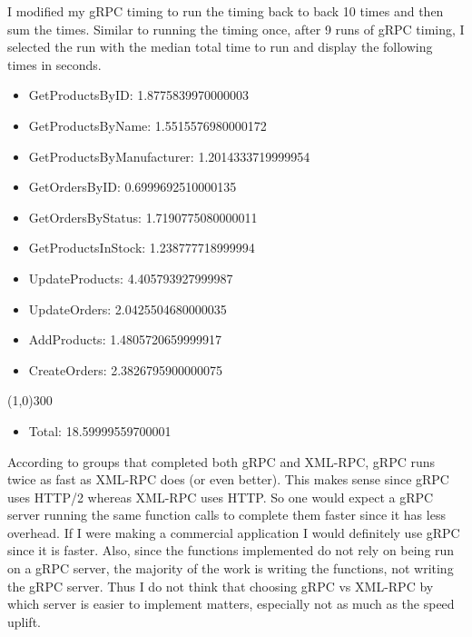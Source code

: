 \documentclass[12pt]{article}
\begin{document}
I modified my gRPC timing to run the timing back to back 10 times and then sum the times.
Similar to running the timing once, after 9 runs of gRPC timing, I selected the run with the median total time to run and display the following times in seconds.
\begin{itemize}
    \item[] GetProductsByID: 1.8775839970000003
    \item[] GetProductsByName: 1.5515576980000172
    \item[] GetProductsByManufacturer: 1.2014333719999954
    \item[] GetOrdersByID: 0.6999692510000135
    \item[] GetOrdersByStatus: 1.7190775080000011
    \item[] GetProductsInStock: 1.238777718999994
    \item[] UpdateProducts: 4.405793927999987
    \item[] UpdateOrders: 2.0425504680000035
    \item[] AddProducts: 1.4805720659999917
    \item[] CreateOrders: 2.3826795900000075
    \end{itemize}
    
    \vspace{-1.2em}
    \line(1,0){300}
    \vspace{-1em}
    
    \begin{itemize}
    \item[] Total: 18.59999559700001
    \end{itemize}


According to groups that completed both gRPC and XML-RPC, gRPC runs twice as fast as XML-RPC does (or even better).
This makes sense since gRPC uses HTTP/2 whereas XML-RPC uses HTTP.
So one would expect a gRPC server running the same function calls to complete them faster since it has less overhead.
If I were making a commercial application I would definitely use gRPC since it is faster.
Also, since the functions implemented do not rely on being run on a gRPC server, the majority of the work is writing the functions, not writing the gRPC server.
Thus I do not think that choosing gRPC vs XML-RPC by which server is easier to implement matters, especially not as much as the speed uplift.
\end{document}
